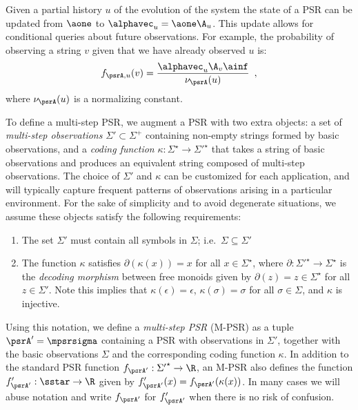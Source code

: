 %
Given a partial history $u$ of the evolution of the system the state of a PSR can be updated from $\aone$ to $\alphavec_u = \aone \A_u$. This update allows for conditional queries about future observations. For example, the probability of observing a string $v$ given that we have already observed $u$ is:
\begin{equation*}
f_{\psrA,u}(v) = \frac{\alphavec_u \A_v \ainf}{\nu_{\psrA}(u)} \enspace,
\end{equation*}
where $\nu_{\psrA}(u)$ is a normalizing constant.

To define a multi-step PSR, we augment a PSR with two extra objects: a set of \emph{multi-step observations} $\Sigma' \subset \Sigma^+$ containing non-empty strings formed by basic observations, and a \emph{coding function} $\kappa : \Sigma^\star \to {\Sigma'}^{\star}$ that takes a string of basic observations and produces an equivalent string composed of multi-step observations.
%
The choice of $\Sigma'$ and $\kappa$ can be customized for each application, and will typically capture frequent patterns of observations arising in a particular environment. For the sake of simplicity and to avoid degenerate situations, we assume these objects satisfy the following requirements:
\begin{enumerate}
\item The set $\Sigma'$ must contain all symbols in $\Sigma$; i.e.\ $\Sigma \subseteq \Sigma'$
\item The function $\kappa$ satisfies $\partial(\kappa(x)) = x$ for all $x \in \Sigma^\star$, where $\partial : {\Sigma'}^\star \to \Sigma^\star$ is the \emph{decoding morphism} between free monoids given by $\partial(z) = z \in \Sigma^\star$ for all $z \in \Sigma'$. Note this implies that $\kappa(\epsilon) = \epsilon$, $\kappa(\sigma) = \sigma$ for all $\sigma \in \Sigma$, and $\kappa$ is injective.
\end{enumerate}
Using this notation, we define a \emph{multi-step PSR} (M-PSR) as a tuple $\psrA' = \mpsrsigma$ containing a PSR with observations in $\Sigma'$, together with the basic observations $\Sigma$ and the corresponding coding function $\kappa$. In addition to the standard PSR function $f_{\psrA'} : {\Sigma'}^\star \to \R$, an M-PSR also defines the function $f_{\psrA'}' : \sstar \to \R$ given by $f_{\psrA'}'(x) = f_{\psrA'}(\kappa(x))$. In many cases we will abuse  notation and write $f_{\psrA'}$ for $f_{\psrA'}'$ when there is no risk of confusion.

